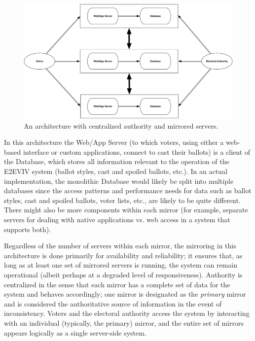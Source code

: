 \begin{figure}[t]
\begin{center}
\includegraphics[width=5.5in]{architecture_resources/mirrored-servers.pdf}
\end{center}
\caption{An architecture with centralized authority and mirrored
  servers.}
\label{figure:arch-mirrored-servers}
\end{figure}

In this architecture the Web/App Server (to which voters, using either
a web-based interface or custom applications, connect to cast their
ballots) is a client of the Database, which stores all information
relevant to the operation of the E2EVIV system (ballot styles, cast
and spoiled ballots, etc.). In an actual implementation, the
monolithic Database would likely be split into multiple databases
since the access patterns and performance needs for data such as
ballot styles, cast and spoiled ballots, voter lists, etc., are likely
to be quite different. There might also be more components within each
mirror (for example, separate servers for dealing with native
applications vs. web access in a system that supports both).

Regardless of the number of servers within each mirror, the mirroring
in this architecture is done primarily for availability and
reliability; it ensures that, as long as at least one set of mirrored
servers is running, the system can remain operational (albeit perhaps
at a degraded level of responsiveness). Authority is centralized in
the sense that each mirror has a complete set of data for the system
and behaves accordingly; one mirror is designated as the
\emph{primary} mirror and is considered the authoritative source of
information in the event of inconsistency. Voters and the electoral
authority access the system by interacting with an individual
(typically, the primary) mirror, and the entire set of mirrors appears
logically as a single server-side system.

